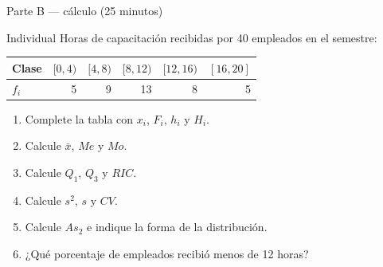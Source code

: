\documentclass[aspectratio=169,10pt]{beamer}
\begin{document}
\begin{frame}{Parte B — cálculo (25 minutos)}
  \begin{alertblock}{Individual}
    \scriptsize
    Horas de capacitación recibidas por 40 empleados en el semestre:

    \vspace{0.15cm}
    \centering
    \begin{tabular}{@{}lrrrrr@{}}
      \toprule
      \textbf{Clase} & $[0,4)$ & $[4,8)$ & $[8,12)$ & $[12,16)$ & $[16,20]$ \\
      \midrule
      $f_i$ & 5 & 9 & 13 & 8 & 5 \\
      \bottomrule
    \end{tabular}

    \vspace{0.2cm}
    \raggedright
    \begin{enumerate}\setlength{\itemsep}{-0.07cm}
      \item Complete la tabla con $x_i$, $F_i$, $h_i$ y $H_i$.
      \item Calcule $\bar{x}$, $Me$ y $Mo$.
      \item Calcule $Q_1$, $Q_3$ y $RIC$.
      \item Calcule $s^2$, $s$ y $CV$.
      \item Calcule $As_2$ e indique la forma de la distribución.
      \item ¿Qué porcentaje de empleados recibió menos de 12 horas?
    \end{enumerate}
  \end{alertblock}
\end{frame}
\end{document}
